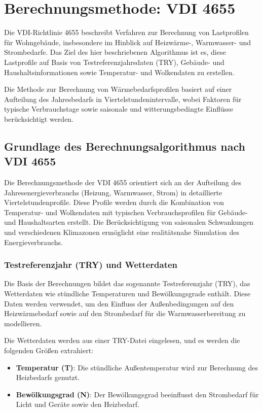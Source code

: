 \section{Berechnungsmethode: VDI 4655}
\label{sec:heat_load_VDI4655_doc}

Die VDI-Richtlinie 4655 beschreibt Verfahren zur Berechnung von Lastprofilen für Wohngebäude, insbesondere im Hinblick auf Heizwärme-, Warmwasser- und Strombedarfe. Das Ziel des hier beschriebenen Algorithmus ist es, diese Lastprofile auf Basis von Testreferenzjahrsdaten (TRY), Gebäude- und Haushaltsinformationen sowie Temperatur- und Wolkendaten zu erstellen.

Die Methode zur Berechnung von Wärmebedarfsprofilen basiert auf einer Aufteilung des Jahresbedarfs in Viertelstundenintervalle, wobei Faktoren für typische Verbrauchstage sowie saisonale und witterungsbedingte Einflüsse berücksichtigt werden.

\subsection{Grundlage des Berechnungsalgorithmus nach VDI 4655}

Die Berechnungsmethode der VDI 4655 orientiert sich an der Aufteilung des Jahresenergieverbrauchs (Heizung, Warmwasser, Strom) in detaillierte Viertelstundenprofile. Diese Profile werden durch die Kombination von Temperatur- und Wolkendaten mit typischen Verbrauchsprofilen für Gebäude- und Haushaltsarten erstellt. Die Berücksichtigung von saisonalen Schwankungen und verschiedenen Klimazonen ermöglicht eine realitätsnahe Simulation des Energieverbrauchs.

\subsubsection{Testreferenzjahr (TRY) und Wetterdaten}
Die Basis der Berechnungen bildet das sogenannte Testreferenzjahr (TRY), das Wetterdaten wie stündliche Temperaturen und Bewölkungsgrade enthält. Diese Daten werden verwendet, um den Einfluss der Außenbedingungen auf den Heizwärmebedarf sowie auf den Strombedarf für die Warmwasserbereitung zu modellieren.

Die Wetterdaten werden aus einer TRY-Datei eingelesen, und es werden die folgenden Größen extrahiert:
\begin{itemize}
    \item \textbf{Temperatur (T)}: Die stündliche Außentemperatur wird zur Berechnung des Heizbedarfs genutzt.
    \item \textbf{Bewölkungsgrad (N)}: Der Bewölkungsgrad beeinflusst den Strombedarf für Licht und Geräte sowie den Heizbedarf.
\end{itemize}

